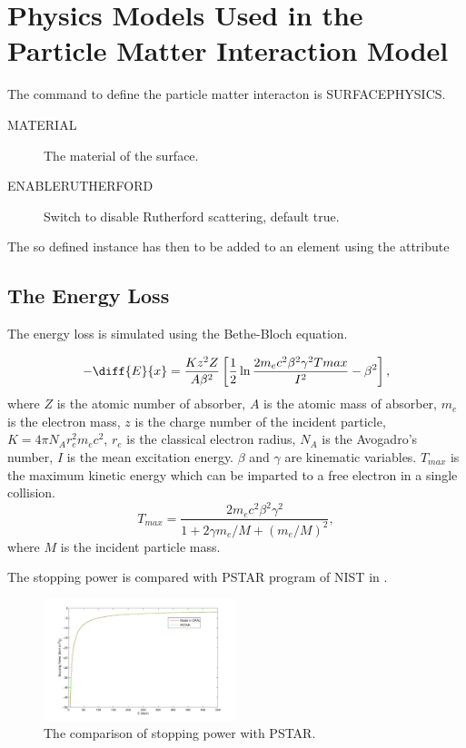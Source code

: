 

\chapter{Physics Models Used in the Particle Matter Interaction Model}
\label{chp:partmatt}

The command to define the particle matter interacton is SURFACEPHYSICS.
\begin{description}
\item[MATERIAL]
The material of the surface.
\item[ENABLERUTHERFORD]
Switch to disable Rutherford scattering, default true.
\end{description}
The so defined instance has then to be added to an element using the attribute

\section{The Energy Loss}

The energy loss is simulated using the Bethe-Bloch equation.

\begin{equation}
\label{eq:dEdx}
-\diff{E}{x}=\frac{K z^2 Z}{A \beta^2}\left[\frac{1}{2} \ln{\frac{2 m_e c^2\beta^2 \gamma^2 Tmax}{I^2}}-\beta^2 \right],
\end{equation}
where $Z$ is the atomic number of absorber, $A$ is the atomic mass of absorber, $m_e$ is the electron mass, $z$ is the charge number of the incident particle, $K=4\pi N_Ar_e^2m_ec^2$, $r_e$ is the classical electron radius, $N_A$ is the Avogadro's number, $I$ is the mean excitation energy. $\beta$ and $\gamma$ are kinematic variables. $T_{max}$ is the maximum kinetic energy which can be imparted to a free electron in a single collision.
\begin{equation}
T_{max}=\frac{2m_ec^2\beta^2\gamma^2}{1+2\gamma m_e/M+(m_e/M)^2},
\end{equation}
where $M$ is the incident particle mass.

The stopping power is compared with PSTAR program of NIST in .
\begin{figure}[h!]
\begin{center}
\includegraphics[width=0.5\textwidth]{figures/partmatter/dEdx}
\end{center}
\caption{The comparison of stopping power with PSTAR. }
\label{fig:dEdx}
\end{figure}

